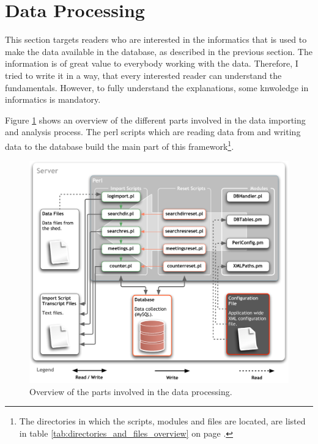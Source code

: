 \newpage
\section{Data Processing}
\label{sec:dataproc}

This section targets readers who are interested in the informatics that is used to make the data available in the database, as described in the previous section. The information is of great value to everybody working with the data. Therefore, I tried to write it in a way, that every interested reader can understand the fundamentals. However, to fully understand the explanations, some knwoledge in informatics is mandatory.      

Figure \ref{fig:app_design_perl} shows an overview of the different parts involved in the data importing and analysis process. The \ac{perl} scripts which are reading data from and writing data to the database build the main part of this framework\footnote{The directories in which the scripts, modules and files are located, are listed in table \ref{tab:directories_and_files_overview} on page \pageref{tab:directories_and_files_overview}.}.

\begin{figure}[htpb]
\begin{center}
  \includegraphics[width=\textwidth]{assets/pdf/app_design_perl.pdf}
  \caption[Data processing overview]{Overview of the parts involved in the data processing.}
  \label{fig:app_design_perl}
\end{center}
\end{figure}

